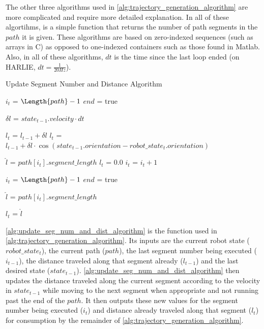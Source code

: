 
The other three algorithms used in \autoref{alg:trajectory_generation_algorithm} are more complicated and require more detailed explanation. In all of these algortihms, \Length is a simple function that returns the number of path segments in the $path$ it is given. These algorithms are based on zero-indexed sequences (such as arrays in C) as opposed to one-indexed containers such as those found in Matlab. Also, in all of these algorithms, $dt$ is the time since the last loop ended (on HARLIE, $dt = \frac{1}{20 Hz}$).

\begin{algorithm}
\caption{Update Segment Number and Distance Algorithm}
\label{alg:update_seg_num_and_dist_algorithm}
\DontPrintSemicolon


{
	$i_t$ = $\Length{path}-1$ \;
	$end$ = true \;
}

$\delta l$ = $state_{t-1}.velocity \cdot dt$ \;

{
	$l_t$ = $l_{t-1} + \delta l$ \;	
}
{
	$l_t$ = $l_{t-1} + \delta l \cdot \cos\left(state_{t-1}.orientation - robot\_state_t.orientation\right) $ \; 
}

$\hat l$ = $path\left[i_t\right].segment\_length$ \;
{
	$l_t$ = $0.0$ \;
	$i_t$ = $i_t + 1$ \;
}

{
	$i_t$ = $\Length{path}-1$ \;
	$end$ = true \;
}

$\hat l$ = $path\left[i_t\right].segment\_length$ \; 

{
	$l_t$ = $\hat l$ \;
}

\end{algorithm}

\autoref{alg:update_seg_num_and_dist_algorithm} is the \UpdateSegmentNumberAndDistance function used in \autoref{alg:trajectory_generation_algorithm}. Its inputs are the current robot state ($robot\_state_t$), the current path ($path$), the last segment number being executed ($i_{t-1}$), the distance traveled along that segment already ($l_{t-1}$) and the last desired state ($state_{t-1}$). \autoref{alg:update_seg_num_and_dist_algorithm} then updates the distance traveled along the current segment according to the velocity in $state_{t-1}$ while moving to the next segment when appropriate and not running past the end of the $path$. It then outputs these new values for the segment number being executed ($i_t$) and distance already traveled along that segment ($l_t$) for consumption by the remainder of \autoref{alg:trajectory_generation_algorithm}.

